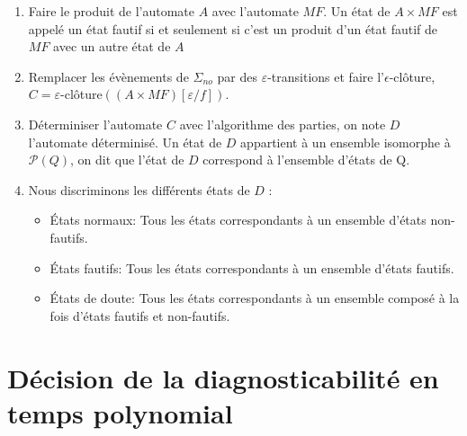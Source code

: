 \documentclass[10pt,a4paper]{article}
\begin{document}
    \begin{enumerate}
            \item Faire le produit de l'automate $A$ avec l'automate $MF$. Un \'etat de $A\times MF$ est appel\'e un \'etat fautif si et seulement si c'est un produit d'un \'etat fautif de $MF$ avec un autre \'etat de $A$
            \item Remplacer les \'ev\`enements de $\Sigma_{no}$ par des $\varepsilon$-transitions et faire l'$\epsilon$-cl\^oture, $C = \varepsilon$-clôture$((A\times MF)[\varepsilon/f])$.
          \item D\'eterminiser l'automate $C$ avec l'algorithme des parties, on note $D$ l'automate d\'eterminis\'e. Un état de $D$ appartient à un ensemble isomorphe à $\mathcal{P}(Q)$, on dit que l'état de $D$ correspond à l'ensemble d'états de Q.
            \item Nous discriminons les diff\'erents \'etats de $D$ :
                    \begin{itemize}
                            \item  \'Etats normaux: Tous les \'etats correspondants à un ensemble d'\'etats non-fautifs.
                           \item \'Etats fautifs:  Tous les \'etats correspondants à un ensemble d'\'etats fautifs.
                            \item \'Etats de doute: Tous les \'etats correspondants à un ensemble composé à la fois d'\'etats fautifs et non-fautifs.
                    \end{itemize}  
                 
    \end{enumerate} 
     

\section{D\'ecision de la diagnosticabilit\'e en temps polynomial}
\end{document}

